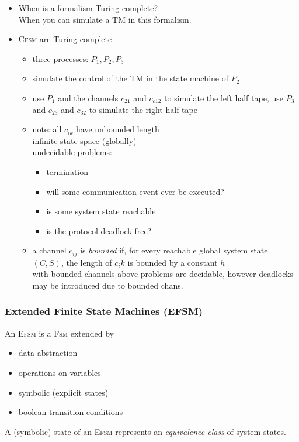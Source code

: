 \documentclass[a4paper, 10pt]{article}
\begin{document}
\begin{itemize}
    \item When is a formalism Turing-complete?
    \\ When you can simulate a TM in this formalism.
    \item \textsc{Cfsm} are Turing-complete
    \begin{itemize}
        \item three processes: $P_1,P_2,P_3$
        \item simulate the control of the TM in the state machine of $P_2$
        \item use $P_1$ and the channels $c_{21}$ and $c_{c12}$ to simulate the left half tape, use $P_3$ and $c_{23}$ and $c_{32}$ to simulate the right half tape
        \item note: all $c_{ik}$ have unbounded length
        \\ \follows infinite state space (globally)
        \\ \follows undecidable problems:
        \begin{itemize}
            \item termination
            \item will some communication event ever be executed?
            \item is some system state reachable
            \item is the protocol deadlock-free?
        \end{itemize}
        \item a channel $c_{ij}$ is \emph{bounded} if, for every reachable global system state $(C,S)$, the length of $c_ik$ is bounded by a constant $h$
        \\ with bounded channels above problems are decidable, however deadlocks may be introduced due to bounded chans.
    \end{itemize}
\end{itemize}

\subsubsection*{Extended Finite State Machines (EFSM)}
An \textsc{Efsm} is a \textsc{Fsm} extended by
\begin{itemize}
    \item data abstraction
    \item operations on variables
    \item symbolic (explicit states)
    \item boolean transition conditions
\end{itemize}
A (symbolic) state of an \textsc{Efsm} represents an \emph{equivalence class} of system states.
\end{document}
